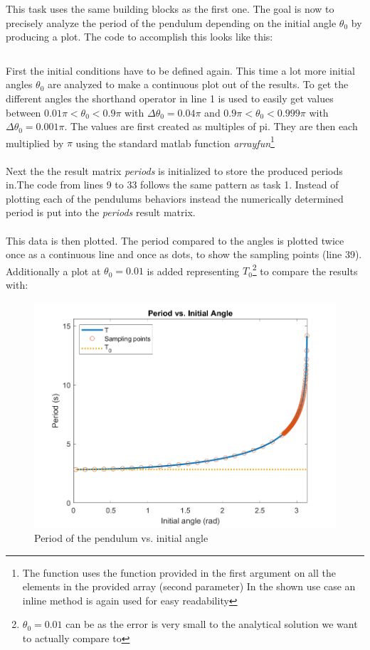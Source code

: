 \documentclass[14pt]{article}
\begin{document}
This task uses the same building blocks as the first one. The goal is now to precisely analyze the period of the
pendulum depending on the initial angle $\theta_0$ by producing a plot. The code to accomplish this looks like this:

\inputminted[linenos]{octave}{./matlab/assignment_2.m}

First the initial conditions have to be defined again. This time a lot more initial angles $\theta_0$ are
analyzed to make a continuous plot out of the results. To get the different angles the shorthand operator in line 1 is used to easily get values
between $ 0.01\pi < \theta_0 < 0.9\pi$ with $\Delta \theta_0 = 0.04\pi $ and $ 0.9\pi < \theta_0 < 0.999\pi$ with $\Delta \theta_0 = 0.001\pi $. The values are first created
as multiples of pi. They are then each multiplied by $\pi$ using the standard matlab function 
\textit{arrayfun}\footnote{The function uses the function provided in the first argument on all the elements in the provided array (second parameter)
In the shown use case an inline method is again used for easy readability}\\
\\
Next the the result matrix \textit{periods} is initialized to store the produced periods in.The code from lines
9 to 33 follows the same pattern as task 1. Instead of plotting each of the pendulums
behaviors instead the numerically determined period is put into the \textit{periods} result matrix.\\
\\
This data is then plotted. The period compared to the angles is plotted twice once as a continuous line and
once as dots, to show the sampling points (line 39). Additionally a plot at $\theta_0 = 0.01$ is added representing $T_0$\footnote{$\theta_0 = 0.01$ can be 
as the error is very small to the analytical solution we want to actually compare to} to compare the results with:

\begin{figure}[H]
  \includegraphics[width=14cm]{./output/assignment2.png}
  \caption{Period of the pendulum vs. initial angle}
  \label{fig:figure6}
\end{figure}
\end{document}
